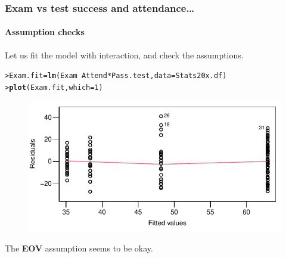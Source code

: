 \documentclass{beamer}\usepackage[]{graphicx}\usepackage[]{xcolor}
\makeatletter
\newcommand{\hlnum}[1]{\textcolor[rgb]{0.686,0.059,0.569}{#1}}%
\newcommand{\hlopt}[1]{\textcolor[rgb]{0,0,0}{#1}}%
\newcommand{\hlstd}[1]{\textcolor[rgb]{0.345,0.345,0.345}{#1}}%
\newcommand{\hlkwb}[1]{\textcolor[rgb]{0.69,0.353,0.396}{#1}}%
\newcommand{\hlkwc}[1]{\textcolor[rgb]{0.333,0.667,0.333}{#1}}%
\newcommand{\hlkwd}[1]{\textcolor[rgb]{0.737,0.353,0.396}{\textbf{#1}}}%
\newenvironment{kframe}{%
 \def\at@end@of@kframe{}%
 \ifinner\ifhmode%
  \def\at@end@of@kframe{\end{minipage}}%
  \begin{minipage}{\columnwidth}%
 \fi\fi%
 \def\FrameCommand##1{\hskip\@totalleftmargin \hskip-\fboxsep
 \colorbox{shadecolor}{##1}\hskip-\fboxsep
     \hskip-\linewidth \hskip-\@totalleftmargin \hskip\columnwidth}%
 \MakeFramed {\advance\hsize-\width
   \@totalleftmargin\z@ \linewidth\hsize
   \@setminipage}}%
 {\par\unskip\endMakeFramed%
 \at@end@of@kframe}
\newenvironment{knitrout}{}{} %
\makeatother
\begin{document}
\begin{frame}[fragile]
\frametitle{Exam vs test success and attendance\ldots}
\framesubtitle{Assumption checks}
Let us fit the model with interaction, and check the assumptions.

\begin{knitrout}\scriptsize
{}\color{fgcolor}\begin{kframe}
\begin{alltt}
\hlstd{> }\hlstd{Exam.fit} \hlkwb{=} \hlkwd{lm}\hlstd{(Exam} \hlopt{~} \hlstd{Attend}\hlopt{*}\hlstd{Pass.test,} \hlkwc{data} \hlstd{= Stats20x.df)}
\hlstd{> }\hlkwd{plot}\hlstd{(Exam.fit,} \hlkwc{which}\hlstd{=}\hlnum{1}\hlstd{)}
\end{alltt}
\end{kframe}
\end{knitrout}



\begin{figure}
  \centering
  \includegraphics{figure/RC-H12-009}
\end{figure}

The \textbf{EOV} assumption seems to be okay.
\end{frame}
\end{document}
